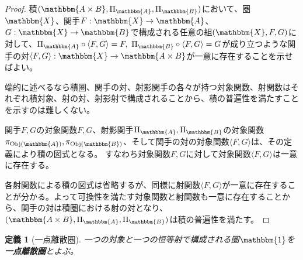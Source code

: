 \documentclass[uplatex,dvipdfmx]{jsarticle}
\newcommand{\cat}[1]{\mathbbm{#1}}
\newcommand{\arrow}{\rightarrow}
\newcommand{\functor}[3]{#1:\cat{#2}\arrow \cat{#3}}
\newcommand{\tuple}[1]{\langle #1\rangle}
\newcommand{\obj}[1]{\mathrm{Obj}(\cat{#1})}
\newtheorem{proof}{証明}[section]
\newtheorem{define}[proof]{定義}
\numberwithin{proof}{subsection}
\begin{document}
	\begin{proof}
		積$(\cat{A\times B},\Pi_\cat{A},\Pi_\cat{B})$において、圏$\cat{X}$、関手$\functor{F}{X}{A}$、$\functor{G}{X}{B}$で構成される任意の組$(\cat{X},F,G)$に対して、$\Pi_\cat{A}\circ\tuple{F,G}=F,\ \Pi_\cat{B}\circ\tuple{F,G}=G$が成り立つような関手の対$\functor{\tuple{F,G}}{X}{A\times B}$が一意に存在することを示せばよい。
		\begin{center}
		\end{center}
		端的に述べるなら積圏、関手の対、射影関手の各々が持つ対象関数、射関数はそれぞれ積対象、射の対、射影射で構成されることから、積の普遍性を満たすことを示すのは難しくない。

		関手$F,G$の対象関数$F,G$、射影関手$\Pi_\cat{A},\Pi_\cat{B}$の対象関数$\pi_{\obj{A}},\pi_{\obj{B}}$、そして関手の対の対象関数$\tuple{F,G}$は、その定義により積の図式となる。
		すなわち対象関数$F,G$に対して対象関数$\tuple{F,G}$は一意に存在する。
		\begin{center}
		\end{center}
		各射関数による積の図式は省略するが、同様に射関数$\tuple{F,G}$が一意に存在することが分かる。よって可換性を満たす対象関数と射関数も一意に存在することから、関手の対は積圏における射の対となり、$(\cat{A\times B},\Pi_\cat{A},\Pi_\cat{B})$は積の普遍性を満たす。
	\end{proof}
	\begin{define}[一点離散圏]
	一つの対象と一つの恒等射で構成される圏$\cat{1}$を\textbf{一点離散圏}とよぶ。
	\end{define}
\end{document}
